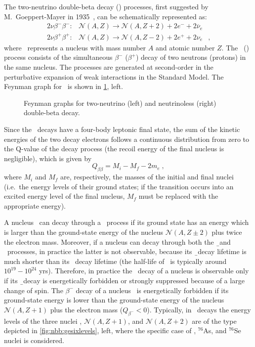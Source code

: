 The two-neutrino double-beta decay (\nnbb) processes, first suggested by
M.~Goeppert-Mayer in 1935~\cite{GoeppertMayer1935}, can be schematically
represented as:
\[
  \begin{array}{llr}
    2\nu\beta^-\beta^-: &
      \mathcal{N}(A,Z) \longrightarrow \mathcal{N}(A,Z+2)+2e^-+2{\overline \nu}_e & \\
    2\nu\beta^+\beta^+: &
      \mathcal{N}(A,Z) \longrightarrow \mathcal{N}(A,Z-2)+2e^++2\nu_e &,
  \end{array}
\]
where \NAZ\ represents a nucleus with mass number $A$ and atomic number $Z$. The
\nnbbm\ (\nnbbp) process consists of the simultaneous $\beta^-$ ($\beta^+$)
decay of two neutrons (protons) in the same nucleus. The processes are
generated at second-order in the perturbative expansion of weak interactions in
the Standard Model. The Feynman graph for \nnbbm\ is shown in
\cref{fig:nbb:feydiag}, left.

\begin{figure}
  \centering%
  \caption{%
    Feynman graphs for two-neutrino (left) and neutrinoless (right) double-beta
    decay.
  }\label{fig:nbb:feydiag}
\end{figure}

Since the \nnbb\ decays have a four-body leptonic final state, the sum of the
kinetic energies of the two decay electrons follows a continuous distribution
from zero to the Q-value of the decay process (the recoil energy of the final
nucleus is negligible), which is given by
\[
  Q_{\beta\beta} = M_i - M_f - 2m_e \;,
\]
where $M_i$ and $M_f$ are, respectively, the masses of the initial and final
nuclei (i.e.~the energy levels of their ground states; if the transition occurs
into an excited energy level of the final nucleus, $M_f$ must be replaced with
the appropriate energy).

A nucleus \NAZ\ can decay through a \nnbb\ process if its ground state has an
energy which is larger than the ground-state energy of the nucleus
$\mathcal{N}(A,Z\pm2)$ plus twice the electron mass. Moreover, if a nucleus can
decay through both the \b\ and \nnbb\ processes, in practice the latter is not
observable, because its \b\ decay lifetime is much shorter than its \nnbb\
decay lifetime (the half-life of \nnbb\ is typically around $10^{19}-10^{24}$
yrs). Therefore, in practice the \nnbb\ decay of a nucleus is observable only
if its \b\ decay is energetically forbidden or strongly suppressed because of a
large change of spin. The $\beta^-$ decay of a nucleus \NAZ\ is energetically
forbidden if its ground-state energy is lower than the ground-state energy of
the nucleus $\mathcal{N}(A,Z+1)$ plus the electron mass ($Q_{\beta^{-}} < 0$).
Typically, in \nnbbm\ decays the energy levels of the three nuclei \NAZ,
$\mathcal{N}(A,Z+1)$, and $\mathcal{N}(A,Z+2)$ are of the type depicted in
\cref{fig:nbb:gesixlevels}, left, where the specific case of \gesix,
$^{76}$As, and $^{76}$Se nuclei is considered.

